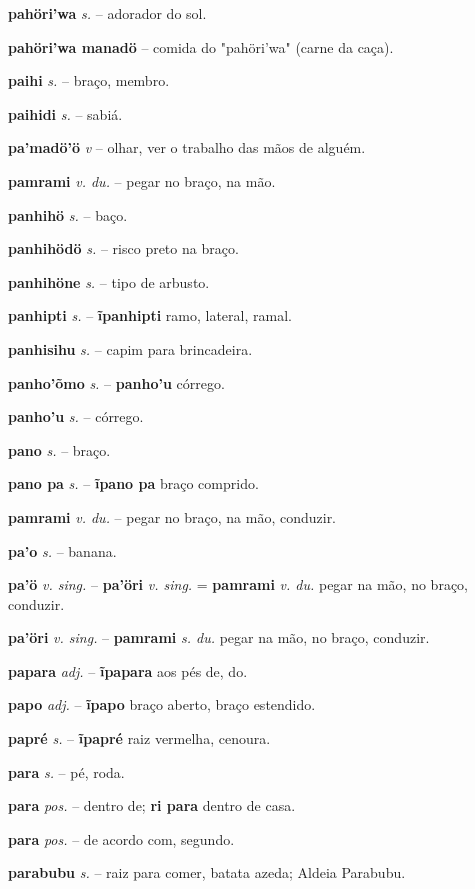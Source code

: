 \textbf{pahöri'wa} \textit{s.} -- adorador do sol.

\textbf{pahöri'wa manadö} -- comida do "pahöri'wa" (carne da caça).

\textbf{paihi} \textit{s.} -- braço, membro.

\textbf{paihidi} \textit{s.} -- sabiá.

\textbf{pa'madö'ö} \textit{v} -- olhar, ver o trabalho das mãos de alguém.

\textbf{pamrami} \textit{v. du.} -- pegar no braço, na mão.

\textbf{panhihö} \textit{s.} -- baço.

\textbf{panhihödö} \textit{s.} -- risco preto na braço.

\textbf{panhihöne} \textit{s.} -- tipo de arbusto.

\textbf{panhipti} \textit{s.} -- \textbf{ĩpanhipti} ramo, lateral, ramal.

\textbf{panhisihu} \textit{s.} -- capim para brincadeira.

\textbf{panho'õmo} \textit{s.} -- \textbf{panho'u} córrego.

\textbf{panho'u} \textit{s.} -- córrego.

\textbf{pano} \textit{s.} -- braço.

\textbf{pano pa} \textit{s.} -- \textbf{ĩpano pa} braço comprido.

\textbf{pamrami} \textit{v. du.} -- pegar no braço, na mão, conduzir.

\textbf{pa'o} \textit{s.} -- banana.

\textbf{pa'ö} \textit{v. sing.} -- \textbf{pa'öri} \textit{v. sing.} = \textbf{pamrami} \textit{v. du.} pegar na mão, no braço, conduzir.

\textbf{pa'öri} \textit{v. sing.} -- \textbf{pamrami} \textit{s. du.} pegar na mão, no braço, conduzir.

\textbf{papara} \textit{adj.} -- \textbf{ĩpapara} aos pés de, do.

\textbf{papo} \textit{adj.} -- \textbf{ĩpapo} braço aberto, braço estendido.

\textbf{papré} \textit{s.} -- \textbf{ĩpapré} raiz vermelha, cenoura.

\textbf{para} \textit{s.} -- pé, roda.

\textbf{para} \textit{pos.} -- dentro de; \textbf{ri para} dentro de casa.

\textbf{para} \textit{pos.} -- de acordo com, segundo.

\textbf{parabubu} \textit{s.} -- raiz para comer, batata azeda; Aldeia Parabubu.

